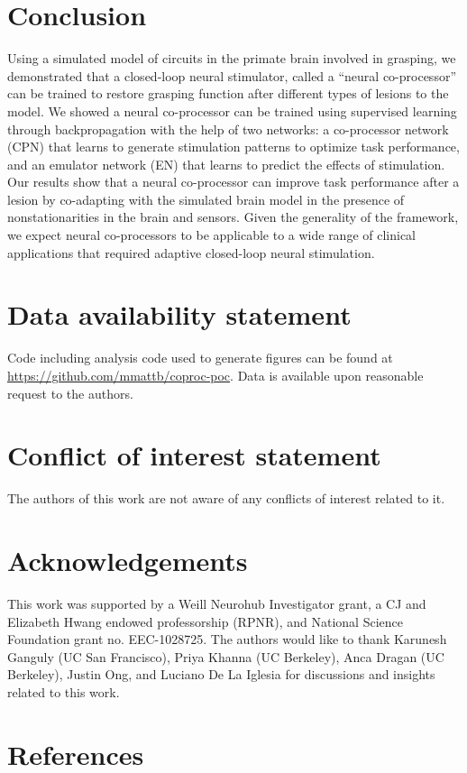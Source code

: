 \documentclass[12pt]{iopart}
\begin{document}
\section{Conclusion}
Using a simulated model of circuits in the primate brain involved in grasping, we
demonstrated that a closed-loop neural stimulator, called a ``neural co-processor''
can be trained to restore grasping function after different types of lesions to the
model. We showed a neural co-processor can be  trained using supervised learning
through backpropagation with the help of two networks: a co-processor network (CPN)
that learns to generate stimulation patterns to optimize task performance, and an
emulator network (EN) that learns to predict the effects of stimulation. Our results
show that a neural co-processor can improve task performance after a lesion by
co-adapting with the simulated brain model in the presence of nonstationarities in the
brain and sensors. Given the generality of the framework, we expect neural
co-processors  to be applicable to a wide range of clinical applications that
required adaptive closed-loop neural stimulation.

\section{Data availability statement}
Code including analysis code used to
generate figures can be found at
\url{https://github.com/mmattb/coproc-poc}.
Data is available upon reasonable request to the authors.

\section{Conflict of interest statement}
The authors of this work are not aware of any conflicts of interest
related to it.

\section{Acknowledgements}
This work was supported by a Weill Neurohub Investigator grant, a CJ and Elizabeth Hwang
endowed professorship (RPNR), and National Science Foundation grant no. EEC-1028725.
The authors would like to thank Karunesh Ganguly (UC San Francisco), Priya Khanna
(UC Berkeley), Anca Dragan (UC Berkeley), Justin Ong, and Luciano De La Iglesia
for discussions and insights related to this work.

\section{References}


\end{document}
